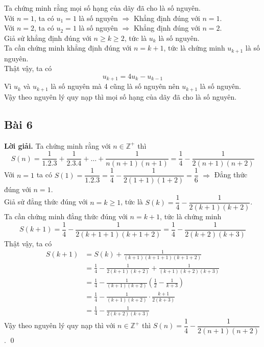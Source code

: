 \documentclass[a4paper,14pt]{article}
\begin{document}
        Ta chứng minh rằng mọi số hạng của dãy đã cho là số nguyên. \\
        Với $n=1$, ta có $u_1=1$ là số nguyên $\Rightarrow$ Khẳng định đúng với $n=1$. \\
        Với $n=2$, ta có $u_2=1$ là số nguyên $\Rightarrow$ Khẳng định đúng với $n=2$. \\
        Giả sử khẳng định đúng với $n\geqslant k\geqslant 2$, tức là $u_k$ là số nguyên. \\
        Ta cần chứng minh khẳng định đúng với $n=k+1$, tức là chứng minh $u_{k+1}$ là số nguyên. \\
        Thật vậy, ta có 
            \[
                u_{k+1}=4u_k-u_{k-1}
            \]
        Vì $u_k$ và $u_{k+1}$ là số nguyên mà 4 cũng là số nguyên nên $u_{k+1}$ là số nguyên. \\
        Vậy theo nguyên lý quy nạp thì mọi số hạng của dãy đã cho là số nguyên.
    \subsection{Bài 6}
        \textbf{Lời giải.}
            Ta chứng minh rằng với $n\in \mathbb{Z}^+$ thì $$S(n)=\frac{1}{1.2.3}+\frac{1}{2.3.4}+\ldots+\frac{1}{n(n+1)(n+1)}=\frac{1}{4}-\frac{1}{2(n+1)(n+2)}$$
            Với $n=1$ ta có $S(1)=\dfrac{1}{1.2.3}=\dfrac{1}{4}-\dfrac{1}{2(1+1)(1+2)}=\dfrac{1}{6}$ $\Rightarrow$ Đẳng thức đúng với $n=1$. \\
            Giả sử đẳng thức đúng với $n=k\geqslant 1$, tức là $S(k)=\dfrac{1}{4}-\dfrac{1}{2(k+1)(k+2)}$. \\
            Ta cần chứng minh đẳng thức đúng với $n=k+1$, tức là chứng minh 
                $$S(k+1)=\dfrac{1}{4}-\dfrac{1}{2(k+1+1)(k+1+2)}=\dfrac{1}{4}-\dfrac{1}{2(k+2)(k+3)}$$
            Thật vậy, ta có
            \begin{align*}
                S(k+1)&=S(k)+\frac{1}{(k+1)(k+1+1)(k+1+2)}
                      \\&=\frac{1}{4}-\frac{1}{2(k+1)(k+2)} + \frac{1}{(k+1)(k+2)(k+3)}
                      \\&=\frac{1}{4}-\frac{1}{(k+1)(k+2)}\left ( \frac{1}{2}-\frac{1}{k+3}\right)
                      \\&=\frac{1}{4}-\frac{1}{(k+1)(k+2)}\cdot\frac{k+1}{2(k+3)}
                      \\&=\frac{1}{4}-\frac{1}{2(k+2)(k+3)}
            \end{align*}
        Vậy theo nguyên lý quy nạp thì với $n\in \mathbb{Z}^+$ thì $S(n)=\dfrac{1}{4}-\dfrac{1}{2(n+1)(n+2)}$.
        \qed
\end{document}
